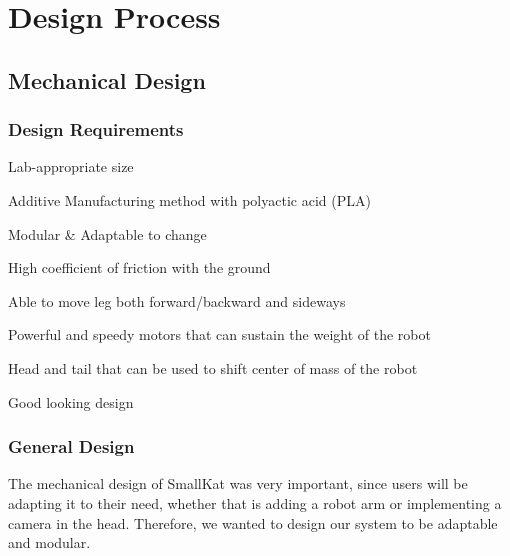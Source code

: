 \section{Design Process} %


    \subsection{Mechanical Design} 

        \subsubsection{Design Requirements}
            \begin{Deliverables}
                \item Lab-appropriate size
                \item Additive Manufacturing method with polyactic acid (PLA)
                \item Modular \& Adaptable to change
                \item High coefficient of friction with the ground
                \item Able to move leg both forward/backward and sideways
                \item Powerful and speedy motors that can sustain the weight of the robot
                \item Head and tail that can be used to shift center of mass of the robot
                \item Good looking design
            \end{Deliverables}
        \subsubsection{General Design}
            The mechanical design of SmallKat was very important, since users will be adapting it to their need, whether that is adding a robot arm or implementing a camera in the head. Therefore, we wanted to design our system to be adaptable and modular.

